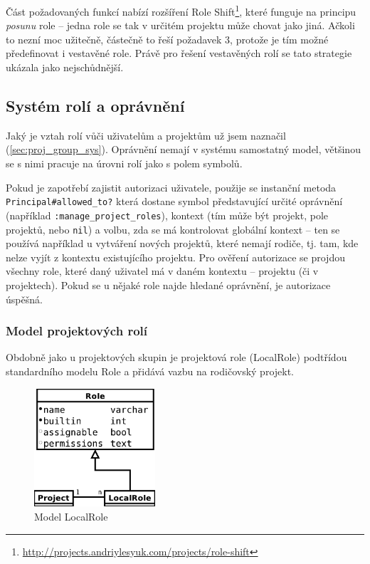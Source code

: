 \documentclass[thesis=B,czech]{FITthesis}[2012/05/02]
\begin{document}
Část požadovaných funkcí nabízí rozšíření Role Shift\footnote{\url{http://projects.andriylesyuk.com/projects/role-shift}},
které funguje na principu \emph{posunu} role -- jedna role se tak
v určitém projektu může chovat jako jiná. Ačkoli to nezní moc užitečně,
částečně to řeší požadavek 3, protože je tím možné předefinovat i vestavěné
role. Právě pro řešení vestavěných rolí se tato strategie ukázala jako
nejschůdnější.

\subsection{Systém rolí a oprávnění}

Jaký je vztah rolí vůči uživatelům a projektům už jsem naznačil
(\ref{sec:proj_group_sys}). Oprávnění nemají v systému samostatný model,
většinou se s nimi pracuje na úrovni rolí jako s polem symbolů.

Pokud je zapotřebí zajistit autorizaci uživatele, použije se instanční
metoda \lstinline!Principal#allowed_to?! která dostane symbol
představující určité oprávnění (například
\lstinline!:manage_project_roles!), kontext (tím může být projekt, pole
projektů, nebo \lstinline!nil!) a volbu, zda se má kontrolovat globální
kontext -- ten se používá například u vytváření nových projektů, které
nemají rodiče, tj. tam, kde nelze vyjít z kontextu existujícího
projektu. Pro ověření autorizace se projdou všechny role, které daný
uživatel má v daném kontextu -- projektu (či v projektech). Pokud se
u nějaké role najde hledané oprávnění, je autorizace úspěšná.

\subsubsection{Model projektových rolí}

Obdobně jako u projektových skupin je projektová role (LocalRole)
podtřídou standardního modelu Role a přidává vazbu na rodičovský
projekt.

\begin{figure}[htbp]
\centering
\includegraphics[width=0.4\textwidth]{role-er1.pdf}
\caption{Model LocalRole}
\end{figure}
\end{document}
